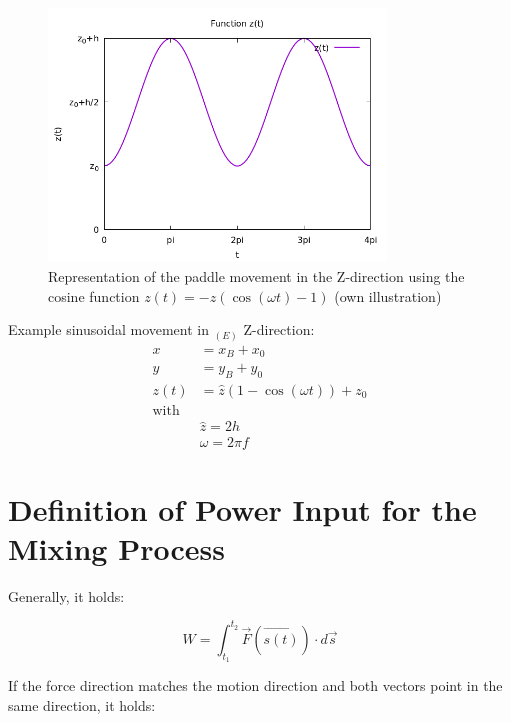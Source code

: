 \begin{figure}[h]
    \centering
    \includegraphics[width=0.8\textwidth]{bilder/cosine-plot_real.png}
    \caption[Representation of Paddle Movement Using the Cosine Function]{Representation of the paddle movement in the Z-direction using the cosine function \( z(t) = -\hat{z}(\cos(\omega t)-1) \) (own illustration)}\label{fig:PaddleMovementCosine}
\end{figure}
\FloatBarrier

Example sinusoidal movement in \( _{(E)}\) Z-direction:
\begin{equation}
    \begin{aligned}
        x &= x_B + x_0\\
        y &= y_B + y_0\\
        z(t) &= \hat{z}\left( 1 - \cos(\omega t) \right) +z_0\\
        \text{with}\\
        &\hat{z} = 2h\\
        &\omega = 2\pi f
    \end{aligned}
\end{equation}

\section{Definition of Power Input for the Mixing Process}

Generally, it holds:

\begin{equation}
    W = \int_{t_1}^{t_2} \vec{F}(\vec{s(t)})\cdot d \vec{s}
\end{equation}

\noindent If the force direction matches the motion direction and both vectors point in the same direction, it holds:

